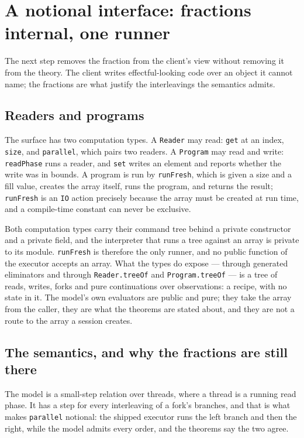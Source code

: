 \documentclass[11pt,a4paper]{article}
\theoremstyle{definition}
\theoremstyle{plain}
\newcommand{\code}[1]{\texttt{#1}}
\begin{document}
\section{A notional interface: fractions internal, one runner}\label{sec:notional}

The next step removes the fraction from the client's view without removing it
from the theory. The client writes effectful-looking code over an object it
cannot name; the fractions are what justify the interleavings the semantics
admits.

\subsection{Readers and programs}

The surface has two computation types. A \code{Reader} may read: \code{get} at
an index, \code{size}, and \code{parallel}, which pairs two readers. A
\code{Program} may read and write: \code{readPhase} runs a reader, and \code{set}
writes an element and reports whether the write was in bounds. A program is run
by \code{runFresh}, which is given a size and a fill value, creates the array
itself, runs the program, and returns the result; \code{runFresh} is an
\code{IO} action precisely because the array must be created at run time, and a
compile-time constant can never be exclusive.

Both computation types carry their command tree behind a private constructor and
a private field, and the interpreter that runs a tree against an array is
private to its module. \code{runFresh} is therefore the only runner, and no
public function of the executor accepts an array. What the types do expose ---
through generated eliminators and through \code{Reader.treeOf} and
\code{Program.treeOf} --- is a tree of reads, writes, forks and pure
continuations over observations: a recipe, with no state in it. The model's own
evaluators are public and pure; they take the array from the caller, they are
what the theorems are stated about, and they are not a route to the array a
session creates.

\subsection{The semantics, and why the fractions are still there}

The model is a small-step relation over threads, where a thread is a running
read phase. It has a step for every interleaving of a fork's branches, and that
is what makes \code{parallel} notional: the shipped executor runs the left
branch and then the right, while the model admits every order, and the theorems
say the two agree.
\end{document}
